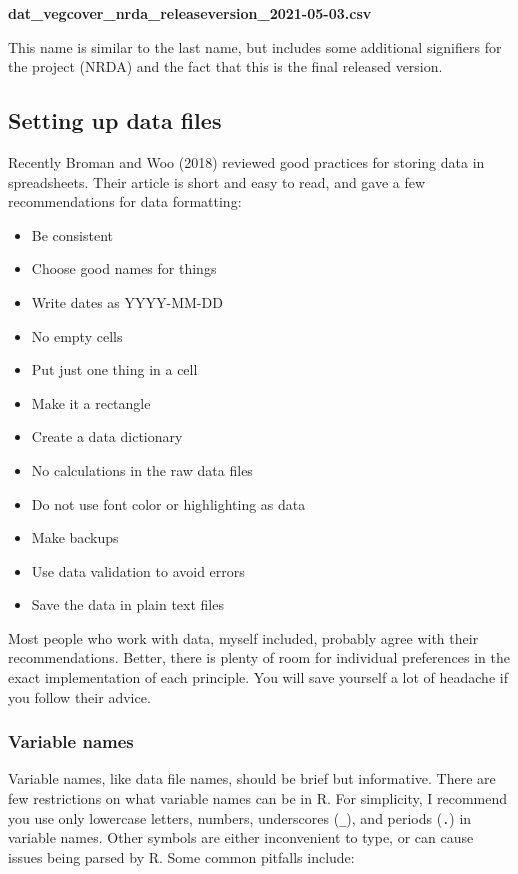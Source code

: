 \documentclass[
  13,
  letterpaper,
]{report}
\begin{document}
\textbf{dat\_vegcover\_nrda\_releaseversion\_2021-05-03.csv}

This name is similar to the last name, but includes some additional
signifiers for the project (NRDA) and the fact that this is the final
released version.

\subsection{Setting up data files}\label{sec-ie-format-set}

Recently Broman and Woo (2018) reviewed good practices for storing data
in spreadsheets. Their article is short and easy to read, and gave a few
recommendations for data formatting:

\begin{itemize}
\item
  Be consistent
\item
  Choose good names for things
\item
  Write dates as YYYY-MM-DD
\item
  No empty cells
\item
  Put just one thing in a cell
\item
  Make it a rectangle
\item
  Create a data dictionary
\item
  No calculations in the raw data files
\item
  Do not use font color or highlighting as data
\item
  Make backups
\item
  Use data validation to avoid errors
\item
  Save the data in plain text files
\end{itemize}

Most people who work with data, myself included, probably agree with
their recommendations. Better, there is plenty of room for individual
preferences in the exact implementation of each principle. You will save
yourself a lot of headache if you follow their advice.

\subsubsection{Variable names}\label{sec-ie-format-set-vars}

Variable names, like data file names, should be brief but informative.
There are few restrictions on what variable names can be in R. For
simplicity, I recommend you use only lowercase letters, numbers,
underscores (\texttt{\_}), and periods (\texttt{.}) in variable names.
Other symbols are either inconvenient to type, or can cause issues being
parsed by R. Some common pitfalls include:
\end{document}
